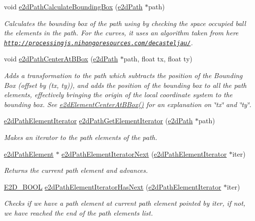 \begin{DoxyCompactItemize}
void \hyperlink{group__e2dPath_ga08a839e808e78ae0f0161be63090906b}{e2d\-Path\-Calculate\-Bounding\-Box} (\hyperlink{structe2dPath}{e2d\-Path} $\ast$path)
\begin{DoxyCompactList}\small\item\em Calculates the bounding box of the path using by checking the space occupied ball the elements in the path. For the curves, it uses an algorithm taken from here \href{http://processingjs.nihongoresources.com/decasteljau/}{\tt http\-://processingjs.\-nihongoresources.\-com/decasteljau/}. \end{DoxyCompactList}\item 
void \hyperlink{group__e2dPath_ga17ec56804be674223581dc4c56849a7c}{e2d\-Path\-Center\-At\-B\-Box} (\hyperlink{structe2dPath}{e2d\-Path} $\ast$path, float tx, float ty)
\begin{DoxyCompactList}\small\item\em Adds a transformation to the path which subtracts the position of the Bounding Box (offset by (tx, ty)), and adds the position of the bounding box to all the path elements, effectively bringing the origin of the local coordinate system to the bounding box. See \hyperlink{group__e2dElement_ga36b01a888c97163c990e16d348aff61c}{e2d\-Element\-Center\-At\-B\-Box()} for an explanation on \char`\"{}tx\char`\"{} and \char`\"{}ty\char`\"{}. \end{DoxyCompactList}\item 
\hyperlink{structe2dPathElementIterator}{e2d\-Path\-Element\-Iterator} \hyperlink{group__e2dPath_ga867f0ea26a61c798f61df27aaf41d6b3}{e2d\-Path\-Get\-Element\-Iterator} (\hyperlink{structe2dPath}{e2d\-Path} $\ast$path)
\begin{DoxyCompactList}\small\item\em Makes an iterator to the path elements of the path. \end{DoxyCompactList}\item 
\hyperlink{structe2dPathElement}{e2d\-Path\-Element} $\ast$ \hyperlink{group__e2dPath_ga3b8113d8c26d1b29e7bfaf5cef98a05e}{e2d\-Path\-Element\-Iterator\-Next} (\hyperlink{structe2dPathElementIterator}{e2d\-Path\-Element\-Iterator} $\ast$iter)
\begin{DoxyCompactList}\small\item\em Returns the current path element and advances. \end{DoxyCompactList}\item 
\hyperlink{Ez2DS_8h_aac8cdc3a3bcd6b56a8c3e0bb6979cbf8}{E2\-D\-\_\-\-B\-O\-O\-L} \hyperlink{group__e2dPath_ga9b06fff11e758bd2db311efe5f90ab1e}{e2d\-Path\-Element\-Iterator\-Has\-Next} (\hyperlink{structe2dPathElementIterator}{e2d\-Path\-Element\-Iterator} $\ast$iter)
\begin{DoxyCompactList}\small\item\em Checks if we have a path element at current path element pointed by iter, if not, we have reached the end of the path elements list. \end{DoxyCompactList}\end{DoxyCompactItemize}


